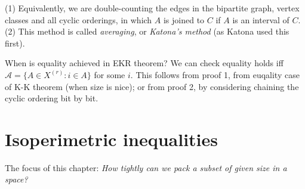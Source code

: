 \documentclass[a4paper]{article}
\begin{document}
\begin{thm}
    \begin{rem}
        (1) Equivalently, we are double-counting the edges in the bipartite graph, vertex classes and all cyclic orderings, in which $A$ is joined to $C$ if $A$ is an interval of $C$.\\
        (2) This method is called \emph{averaging}, or \emph{Katona's method} (as Katona used this first).
    \end{rem}
\end{thm}

When is equality achieved in EKR theorem? We can check equality holds iff $\mathcal{A} = \{A \in X^{(r)}: i \in A\}$ for some $i$. This follows from proof 1, from euqality case of K-K theorem (when size is nice); or from proof 2, by considering chaining the cyclic ordering bit by bit.

\newpage

\section{Isoperimetric inequalities}
The focus of this chapter: \emph{How tightly can we pack a subset of given size in a space?}
\end{document}
